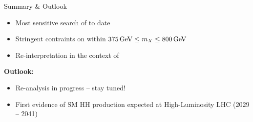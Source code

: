 \documentclass[11pt, xcolor={dvipsnames}, aspectratio=169, notes]{beamer}
\begin{document}
\begin{frame}{Summary \& Outlook}
  \begin{itemize}
    \setlength{\itemsep}{1em}

  \item Most sensitive search of  to date

  \item Stringent contraints on  within
    $\SI{375}{\GeV} \leq \mX \leq \SI{800}{\GeV}$

  \item Re-interpretation in the context of 
  \end{itemize}

  \vspace*{1em}

  \textbf{Outlook:}
  \begin{itemize}
    \setlength{\itemsep}{1em}

  \item Re-analysis in progress -- stay tuned!

  \item First evidence of SM HH production expected at High-Luminosity LHC (2029
    -- 2041)

  \end{itemize}
\end{frame}

\end{document}
